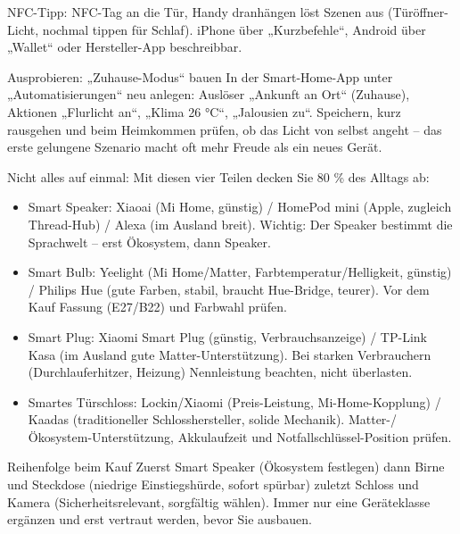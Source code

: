 NFC-Tipp: NFC-Tag an die Tür, Handy dranhängen löst Szenen aus (Türöffner-Licht, nochmal tippen für Schlaf). iPhone über „Kurzbefehle“, Android über „Wallet“ oder Hersteller-App beschreibbar.

\begin{tcbpractice}{Ausprobieren: „Zuhause-Modus“ bauen}
In der Smart-Home-App unter „Automatisierungen“ neu anlegen: Auslöser „Ankunft an Ort“ (Zuhause), Aktionen „Flurlicht an“, „Klima 26 °C“, „Jalousien zu“. Speichern, kurz rausgehen und beim Heimkommen prüfen, ob das Licht von selbst angeht – das erste gelungene Szenario macht oft mehr Freude als ein neues Gerät.

\end{tcbpractice}


Nicht alles auf einmal: Mit diesen vier Teilen decken Sie 80 \% des Alltags ab:

\begin{itemize}
  \item Smart Speaker: Xiaoai (Mi Home, günstig) / HomePod mini (Apple, zugleich Thread-Hub) / Alexa (im Ausland breit). Wichtig: Der Speaker bestimmt die Sprachwelt – erst Ökosystem, dann Speaker.
  \item Smart Bulb: Yeelight (Mi Home/Matter, Farbtemperatur/Helligkeit, günstig) / Philips Hue (gute Farben, stabil, braucht Hue-Bridge, teurer). Vor dem Kauf Fassung (E27/B22) und Farbwahl prüfen.
  \item Smart Plug: Xiaomi Smart Plug (günstig, Verbrauchsanzeige) / TP-Link Kasa (im Ausland gute Matter-Unterstützung). Bei starken Verbrauchern (Durchlauferhitzer, Heizung) Nennleistung beachten, nicht überlasten.
  \item Smartes Türschloss: Lockin/Xiaomi (Preis-Leistung, Mi-Home-Kopplung) / Kaadas (traditioneller Schlosshersteller, solide Mechanik). Matter-/Ökosystem-Unterstützung, Akkulaufzeit und Notfallschlüssel-Position prüfen.
\end{itemize}

\begin{tcbinfo}{Reihenfolge beim Kauf}
Zuerst Smart Speaker (Ökosystem festlegen) dann Birne und Steckdose (niedrige Einstiegshürde, sofort spürbar) zuletzt Schloss und Kamera (Sicherheitsrelevant, sorgfältig wählen). Immer nur eine Geräteklasse ergänzen und erst vertraut werden, bevor Sie ausbauen.

\end{tcbinfo}

